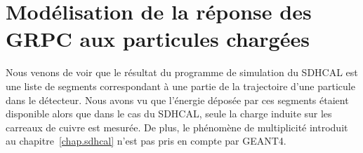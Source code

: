 
\section{Modélisation de la réponse des GRPC aux particules chargées}
Nous venons de voir que le résultat du programme de simulation du SDHCAL est une liste de segments correspondant à une partie de la trajectoire d'une particule dans le détecteur. Nous avons vu que l'énergie déposée par ces segments étaient disponible alors que dans le cas du SDHCAL, seule la charge induite sur les carreaux de cuivre est mesurée. De plus, le phénomène de multiplicité introduit au chapitre~\ref{chap.sdhcal} n'est pas pris en compte par GEANT4. 
\label{sec.digit-algo}

